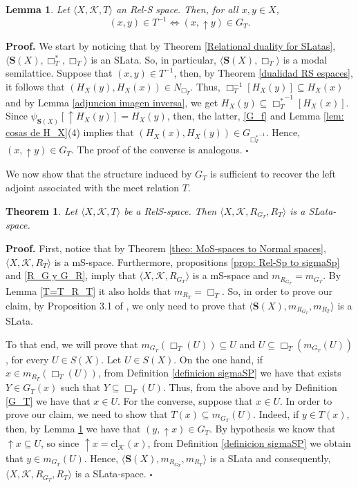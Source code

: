 \documentclass{article}
\newtheorem{lemma}{\bf Lemma}[section]
\newtheorem{theorem}{\bf Theorem}[section]
\newenvironment{proof}
{\par\noindent\textbf{Proof. }\rm}
{\hfill$\boldsymbol{\square}$\par\vspace{0.3cm}}
\begin{document}
\begin{lemma}\label{S_G_T=T^{-1}}
    Let $\langle X, \mathcal{K}, T\rangle$ an Rel-S space. Then, for all $x,y\in X$,
    \[(x,y)\in T^{-1} \iff (x,\uparrow y) \in G_T. \]
\end{lemma}
\begin{proof}
    We start by noticing that by Theorem \ref{Relational duality for SLatas}, $\langle \mathbf{S}(X), \Box_T^{\ast}, \Box_T\rangle$ is an SLata. So, in particular, $\langle \mathbf{S}(X),\Box_T\rangle$ is a modal semilattice. Suppose that $(x,y)\in T^{-1}$, then, by Theorem \ref{dualidad RS espaces}, it follows that $(H_X(y), H_X(x))\in N_{\Box_T}$. Thus, $\Box_T^{-1}[H_X(y)]\subseteq H_X(x)$ and by Lemma \ref{adjuncion imagen inversa}, we get $H_X(y)\subseteq {\Box_T^{\ast}}^{-1}[H_X(x)]$. Since $\psi_{\mathbf{S}(X)}[\uparrow H_X(y)]=H_X(y)$, then, the latter, \eqref{G_f} and Lemma \ref{lem: cosas de H_X}(4) implies that $(H_X(x),H_X(y))\in G_{{\Box_T^{\ast}}^{-1}}$. Hence, $(x, \uparrow y)\in G_T$. The proof of the converse is analogous.
\end{proof}

We now show that the structure induced by $G_T$ is sufficient to recover the left adjoint associated with the meet relation $T$.

\begin{theorem}\label{de Rel a SLatasp}
   Let $\langle X, \mathcal{K}, T\rangle$ be a RelS-space. Then $\langle X, \mathcal{K}, R_{G_T}, R_T\rangle$ is a SLata-space.
\end{theorem}
\begin{proof}
First, notice that by Theorem \ref{theo: MoS-spaces to Normal spaces}, $\langle X, \mathcal{K},R_T\rangle$ is a mS-space. Furthermore, propositions \ref{prop: Rel-Sp to sigmaSp} and \ref{R_G y G_R}, imply that $\langle X, \mathcal{K}, R_{G_T}\rangle$ is a mS-space and $m_{R_{G_T}}=m_{G_T}$. By Lemma \ref{T=T_R_T} it also holds that $m_{R_T}=\Box_T$. So, in order to prove our claim, by Proposition 3.1 of \cite{GPZ}, we only need to prove that $\langle \mathbf{S}(X),m_{R_{G_T}}, m_{R_T}\rangle$ is a SLata. 
 
To that end, we will prove that $m_{G_T}(\Box_T(U))\subseteq U$ and $U \subseteq \Box_T(m_{G_T}(U))$, for every $U \in S(X)$. Let $U\in S(X)$. On the one hand, if $x \in m_{R_T}(\Box_T(U))$, from Definition \ref{definicion sigmaSP} we have that exists $Y \in G_T(x)$ such that $Y \subseteq \Box_T(U)$. Thus, from the above and by Definition \ref{G_T} we have that $x \in U$. For the converse, suppose that $x \in U$. In order to prove our claim, we need to show that $T(x)\subseteq m_{G_T}(U)$. Indeed, if $y \in T(x)$, then, by Lemma \ref{S_G_T=T^{-1}} we have that $(y, \uparrow x) \in G_T$. By hypothesis we know that $\uparrow x\subseteq U$, so since $\uparrow x=\mathrm{cl}_{\mathcal{K}}(x)$, from Definition \ref{definicion sigmaSP} we obtain that $y \in m_{G_T}(U)$. Hence, $\langle \mathbf{S}(X),m_{R_{G_T}}, m_{R_T}\rangle$ is a SLata and consequently, $\langle X, \mathcal{K}, R_{G_T}, R_T\rangle$ is a SLata-space.
\end{proof}
\end{document}
